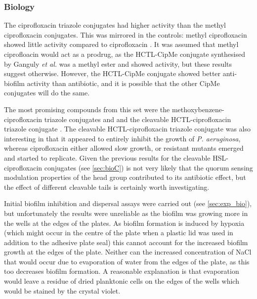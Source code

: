 \subsubsection{Biology}

The ciprofloxacin triazole conjugates had higher activity than the methyl ciprofloxacin conjugates. This was mirrored in the controls: methyl ciprofloxacin  showed little activity compared to ciprofloxacin . It was assumed that methyl ciprofloacin  would act as a prodrug, as the HCTL-CipMe conjugate  synthesised by Ganguly \textit{et al.}\cite{Ganguly2011} was a methyl ester and showed activity, but these results suggest otherwise. However, the HCTL-CipMe conjugate  showed better anti-biofilm activity than antibiotic, and it is possible that the other CipMe conjugates will do the same.

The most promising compounds from this set were the methoxybenzene-ciprofloxacin triazole conjugates  and  and the cleavable HCTL-ciprofloxacin triazole conjugate . The cleavable HCTL-ciprofloxacin triazole conjugate  was also interesting in that it appeared to entirely inhibit the growth of \textit{P. aeruginosa}, whereas ciprofloxacin  either allowed slow growth, or resistant mutants emerged and started to replicate\cite{Su2010}. Given the previous results for the cleavable HSL-ciprofloxacin conjugates (see \ref{sec:bioC}) is not very likely that the quorum sensing modulation properties of the head group contributed to its antibiotic effect, but the effect of different cleavable tails is certainly worth investigating.

Initial biofilm inhibition and dispersal assays were carried out (see \ref{sec:exp_bio}), but unfortunately the results were unreliable as the biofilm was growing more in the wells at the edges of the plates.
As biofilm formation is induced by hypoxia\cite{Ghotaslou2013} (which might occur in the centre of the plate when a plastic lid was used in addition to the adhesive plate seal) this cannot account for the increased biofilm growth at the edges of the plate. Neither can the increased concentration of NaCl that would occur due to evaporation of water from the edges of the plate, as this too decreases biofilm formation\cite{Bazire2007}. %
A reasonable explanation is that evaporation would leave a residue of dried planktonic cells on the edges of the wells which would be stained by the crystal violet.